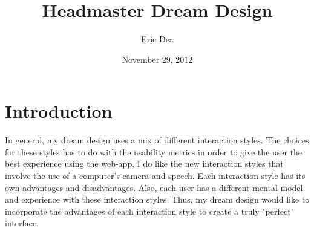\documentclass{article}
\title{Headmaster Dream Design}
\author{Eric Dea}
\date{November 29, 2012}
\begin{document}
\maketitle


\pagebreak
\tableofcontents

\pagebreak
\listoffigures

\pagebreak

%
%
\section{Introduction}
\label{introduction}

In general, my dream design uses a mix of different interaction styles.  The choices for these styles has to do with the usability metrics in order to give the user the best experience using the web-app.  I do like the new interaction styles that involve the use of a computer's camera and speech.  Each interaction style has its own advantages and disadvantages.  Also, each user has a different mental model and experience with these interaction styles.  Thus, my dream design would like to incorporate the advantages of each interaction style to create a truly "perfect" interface.
\end{document}
